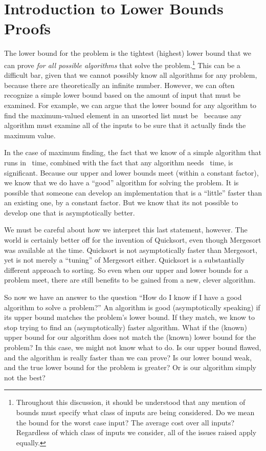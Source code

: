 \section{Introduction to Lower Bounds Proofs}
\label{BoundsIntro}

The lower bound for the problem is the tightest (highest) lower bound
that we can prove \emph{for all possible algorithms} that solve the
problem.\footnote{Throughout this discussion, it should   be 
understood that any mention of bounds must specify what class of
inputs are being considered.
Do we mean the bound for the worst case input?
The average cost over all inputs?
Regardless of which class of inputs we
consider, all of the issues raised apply equally.}
This can be a difficult bar, given that we cannot possibly know all
algorithms for any problem, because there are theoretically an infinite
number.
However, we can often recognize a simple lower bound based on the
amount of input that must be examined.
For example, we can argue that the lower bound for any algorithm to
find the maximum-valued element in an unsorted list must be \Omegan\
because any algorithm must examine all of the inputs to be sure that
it actually finds the maximum value.

In the case of maximum finding, the fact that we know of a simple
algorithm that runs in \On\ time, combined with the fact that any
algorithm needs \Omegan\ time, is significant.
Because our upper and lower bounds meet (within a constant factor), we
know that we do have a ``good'' algorithm for solving the problem.
It is possible that someone can develop an implementation that is a
``little'' faster than an existing one, by a constant factor.
But we know that its not possible to develop one that is
asymptotically better.

We must be careful about how we interpret this last statement,
however.
The world is certainly better off for the invention of Quicksort,
even though Mergesort was available at the time.
Quicksort is not asymptotically faster than Mergesort, yet is not
merely a ``tuning'' of Mergesort either.
Quicksort is a substantially different approach to sorting.
So even when our upper and lower bounds for a problem meet,
there are still benefits to be gained from a new, clever algorithm.

So now we have an answer to the question
``How do I know if I have a good algorithm to solve a problem?''
An algorithm is good (asymptotically speaking) if its upper bound
matches the problem's lower bound.
If they match, we know to stop trying to find an (asymptotically)
faster algorithm.
What if the (known) upper bound for our algorithm does not
match the (known) lower bound for the problem?
In this case, we might not know what to do.
Is our upper bound flawed, and the algorithm is really faster than we
can prove?
Is our lower bound weak, and the true lower bound for the problem is
greater?
Or is our algorithm simply not the best?

